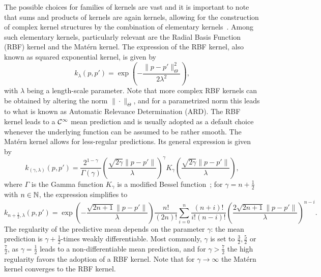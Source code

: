 The possible choices for families of kernels are vast and it is important to note that sums and products of kernels are again kernels, allowing for the construction of complex kernel structures by the combination of elementary kernels~\cite{Duvenaud}.
Among such elementary kernels, particularly relevant are the Radial Basis Function (RBF) kernel and the Matérn kernel. \newline
The expression of the RBF kernel, also known as squared exponential kernel, is given by
\begin{equation}\label{eq:RBF-kernel}
    k_{\lambda}(p, p') = \exp\left(-\frac{\|p - p'\|_\Theta^2}{2\lambda^2}\right),
\end{equation}
with $\lambda$ being a length-scale parameter. 
Note that more complex RBF kernels can be obtained by altering the norm $\| \cdot \|_\Theta$, and for a parametrized norm this leads to what is known as Automatic Relevance Determination (ARD).
The RBF kernel leads to a $\mathcal C^\infty$ mean prediction and is usually adopted as a default choice whenever the underlying function can be assumed to be rather smooth. \newline
The Matérn kernel allows for less-regular predictions. Its general expression is given by
\[
k_{(\gamma, \lambda)}(p, p') = \frac{2^{1-\gamma}}{\Gamma(\gamma)} \left( \frac{\sqrt{2\gamma} \|p - p'\|}{\lambda} \right)^\gamma K_\gamma \left( \frac{\sqrt{2\gamma} \|p - p'\|}{\lambda} \right),
\]
where $\Gamma$ is the Gamma function $K_\gamma$ is a modified Bessel function~\cite[sec. 9.6]{AbramowitzStegun1964};
for $\gamma = n + \frac{1}{2}$ with $n\in \mathbb N$, the expression simplifies to 
\[
     k_{n+\frac{1}{2}, \lambda}(p, p')=\exp \left(-{\frac {{\sqrt {2n+1}}\|p - p'\|}{\lambda }}\right){\frac {n!}{(2n)!}}\sum _{i=0}^{n}{\frac {(n+i)!}{i!(n-i)!}}\left({\frac {2{\sqrt {2n+1}}\|p - p'\|}{\lambda }}\right)^{n-i}.
\]
The regularity of the predictive mean depends on the parameter $\gamma$: the mean prediction is $\gamma + \frac{1}{2}$-times weakly differentiable.
Most commonly, $\gamma$ is set to $\frac{3}{2}, \frac{5}{2}$ or $\frac{7}{2}$, as $\gamma = \frac{1}{2}$ leads to a non-differentiable mean prediction, and for $\gamma > \frac{7}{2}$ the high regularity favors the adoption of a RBF kernel.
Note that for $\gamma \rightarrow \infty$ the Matérn kernel converges to the RBF kernel. \medbreak

